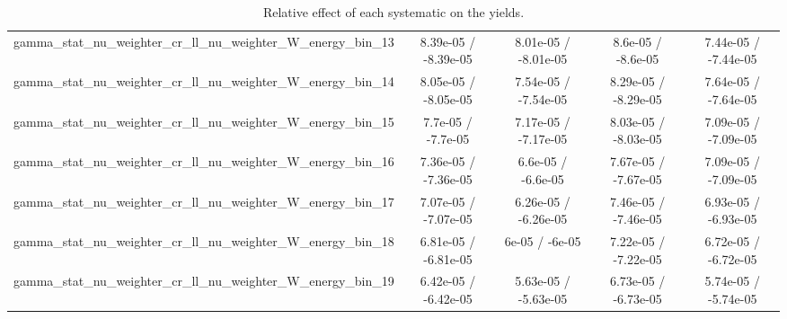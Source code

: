 \documentclass[10pt]{article}
\begin{document}
\begin{table}[htbp]
\begin{center}
\begin{tabular}{|c|c|c|c|c|}
  gamma_stat_nu_weighter_cr_ll_nu_weighter_W_energy_bin_13 & 8.39e-05 / -8.39e-05 & 8.01e-05 / -8.01e-05 & 8.6e-05 / -8.6e-05 & 7.44e-05 / -7.44e-05 \\ 
  gamma_stat_nu_weighter_cr_ll_nu_weighter_W_energy_bin_14 & 8.05e-05 / -8.05e-05 & 7.54e-05 / -7.54e-05 & 8.29e-05 / -8.29e-05 & 7.64e-05 / -7.64e-05 \\ 
  gamma_stat_nu_weighter_cr_ll_nu_weighter_W_energy_bin_15 & 7.7e-05 / -7.7e-05 & 7.17e-05 / -7.17e-05 & 8.03e-05 / -8.03e-05 & 7.09e-05 / -7.09e-05 \\ 
  gamma_stat_nu_weighter_cr_ll_nu_weighter_W_energy_bin_16 & 7.36e-05 / -7.36e-05 & 6.6e-05 / -6.6e-05 & 7.67e-05 / -7.67e-05 & 7.09e-05 / -7.09e-05 \\ 
  gamma_stat_nu_weighter_cr_ll_nu_weighter_W_energy_bin_17 & 7.07e-05 / -7.07e-05 & 6.26e-05 / -6.26e-05 & 7.46e-05 / -7.46e-05 & 6.93e-05 / -6.93e-05 \\ 
  gamma_stat_nu_weighter_cr_ll_nu_weighter_W_energy_bin_18 & 6.81e-05 / -6.81e-05 & 6e-05 / -6e-05 & 7.22e-05 / -7.22e-05 & 6.72e-05 / -6.72e-05 \\ 
  gamma_stat_nu_weighter_cr_ll_nu_weighter_W_energy_bin_19 & 6.42e-05 / -6.42e-05 & 5.63e-05 / -5.63e-05 & 6.73e-05 / -6.73e-05 & 5.74e-05 / -5.74e-05 \\ 
\hline 
\end{tabular} 
\caption{Relative effect of each systematic on the yields.} 
\end{center} 
\end{table} 
\end{document}
